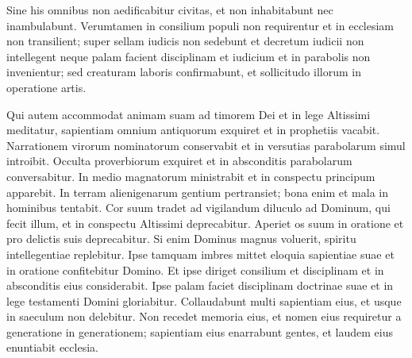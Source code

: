 \begin{biblechapter}
\begin{biblechapter}
\begin{biblechapter}
\begin{biblechapter}
\begin{biblechapter}
\begin{biblechapter}
\begin{biblechapter}
\begin{biblechapter}
\begin{biblechapter}
\begin{biblechapter}
\begin{biblechapter}
\begin{biblechapter}
\begin{biblechapter}
\begin{biblechapter}
\begin{biblechapter}
\begin{biblechapter}
\begin{biblechapter}
\begin{biblechapter}
\begin{biblechapter}
\begin{biblechapter}
\begin{biblechapter}
\begin{biblechapter}
\begin{biblechapter}
\begin{biblechapter}
\begin{biblechapter}
\begin{biblechapter}
\begin{biblechapter}
\begin{biblechapter}
\begin{biblechapter}
\begin{biblechapter}
\begin{biblechapter}
\begin{biblechapter}
\begin{biblechapter}
\begin{biblechapter}
\begin{biblechapter}
\begin{biblechapter}
\begin{biblechapter}
\begin{biblechapter}
 \verse Sine his omnibus non aedificabitur civitas,
 \verse et non inhabitabunt nec inambulabunt.
 Verumtamen in consilium populi non requirentur
 et in ecclesiam non transilient;
 \verse super sellam iudicis non sedebunt
 et decretum iudicii non intellegent
 neque palam facient disciplinam et iudicium
 et in parabolis non invenientur;
 \verse sed creaturam laboris confirmabunt,
 et sollicitudo illorum in operatione artis.
 
\begin{biblechapter}
\verse Qui autem accommodat animam suam ad timorem Dei
 et in lege Altissimi meditatur,
 sapientiam omnium antiquorum exquiret
 et in prophetiis vacabit.
 \verse Narrationem virorum nominatorum conservabit
 et in versutias parabolarum simul introibit.
 \verse Occulta proverbiorum exquiret
 et in absconditis parabolarum conversabitur.
 \verse In medio magnatorum ministrabit
 et in conspectu principum apparebit.
 \verse In terram alienigenarum gentium pertransiet;
 bona enim et mala in hominibus tentabit.
 \verse Cor suum tradet ad vigilandum diluculo
 ad Dominum, qui fecit illum,
 et in conspectu Altissimi deprecabitur.
 \verse Aperiet os suum in oratione
 et pro delictis suis deprecabitur.
 \verse Si enim Dominus magnus voluerit,
 spiritu intellegentiae replebitur.
 \verse Ipse tamquam imbres mittet eloquia sapientiae suae
 et in oratione confitebitur Domino.
 \verse Et ipse diriget consilium et disciplinam
 et in absconditis eius considerabit.
 \verse Ipse palam faciet disciplinam doctrinae suae
 et in lege testamenti Domini gloriabitur.
 \verse Collaudabunt multi sapientiam eius,
 et usque in saeculum non delebitur.
 \verse Non recedet memoria eius,
 et nomen eius requiretur a generatione in generationem;
 \verse sapientiam eius enarrabunt gentes,
 et laudem eius enuntiabit ecclesia.

\end{biblechapter}
\end{biblechapter}
\end{biblechapter}
\end{biblechapter}
\end{biblechapter}
\end{biblechapter}
\end{biblechapter}
\end{biblechapter}
\end{biblechapter}
\end{biblechapter}
\end{biblechapter}
\end{biblechapter}
\end{biblechapter}
\end{biblechapter}
\end{biblechapter}
\end{biblechapter}
\end{biblechapter}
\end{biblechapter}
\end{biblechapter}
\end{biblechapter}
\end{biblechapter}
\end{biblechapter}
\end{biblechapter}
\end{biblechapter}
\end{biblechapter}
\end{biblechapter}
\end{biblechapter}
\end{biblechapter}
\end{biblechapter}
\end{biblechapter}
\end{biblechapter}
\end{biblechapter}
\end{biblechapter}
\end{biblechapter}
\end{biblechapter}
\end{biblechapter}
\end{biblechapter}
\end{biblechapter}
\end{biblechapter}
